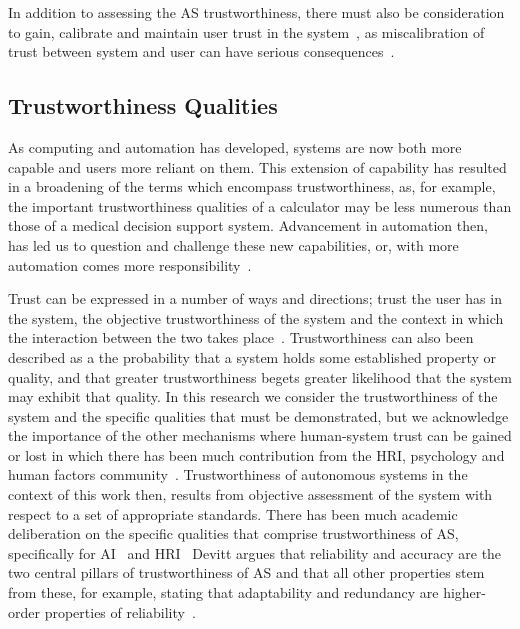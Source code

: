 In addition to assessing the AS trustworthiness, there must also be consideration to gain, calibrate and maintain user trust in the system~\cite{kok2020trust, Chiou2021}, as miscalibration of trust between system and user can have serious consequences~\cite{kok2020trust}. 





\subsection{Trustworthiness Qualities}

As computing and automation has developed, systems are now both more capable and users more reliant on them. This extension of capability has resulted in a broadening of the terms which encompass trustworthiness, as, for example, the important trustworthiness qualities of a calculator may be less numerous than those of a medical decision support system. Advancement in automation then, has led us to question and challenge these new capabilities, or, with more automation comes more responsibility~\cite{Yazdanpanah2021}. 

Trust can be expressed in a number of ways and directions; trust the user has in the system, the objective trustworthiness of the system and the context in which the interaction between the two takes place~\cite{Hancock2021}. 
%
Trustworthiness can also been described as a the probability that a system holds some established property or quality, and that greater trustworthiness begets greater likelihood that the system may exhibit that quality. 
%
In this research we consider the trustworthiness of the system and the specific qualities that must be demonstrated, but we acknowledge the importance of the other mechanisms where human-system trust can be gained or lost in which there has been much contribution from the HRI, psychology and human factors community~\cite{Floridi2019,Lee2004,kok2020trust,Chiou2021,Kohn2021,kraus2022trustworthy}. 
%
Trustworthiness of autonomous systems in the context of this work then, results from objective assessment of the system with respect to a set of appropriate standards. 
%
There has been much academic deliberation on the specific qualities that comprise trustworthiness of AS, specifically for AI~\cite{Thiebes2021,Wing2021} and HRI~\cite{kraus2022trustworthy,atkinson2012trust}
%
Devitt argues that reliability and accuracy are the two central pillars of trustworthiness of AS and that all other properties stem from these, for example, stating that adaptability and redundancy are higher-order properties of reliability~\cite{devitt2018trustworthiness}. 

